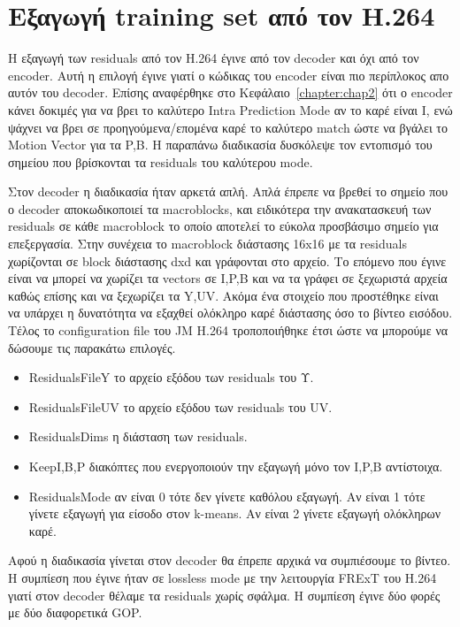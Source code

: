 \newpage

\section{Εξαγωγή training set από τον H.264}
\label{section:sect43}

\indent Η εξαγωγή των residuals από τον H.264 έγινε από τον decoder και όχι από τον encoder. Αυτή η επιλογή έγινε γιατί ο κώδικας του encoder είναι πιο περίπλοκος απο αυτόν του decoder. Επίσης αναφέρθηκε στο Κεφάλαιο~\ref{chapter:chap2} ότι ο encoder κάνει δοκιμές για να βρει το καλύτερο Intra Prediction Mode αν το καρέ είναι I, ενώ ψάχνει να βρει σε προηγούμενα/επομένα καρέ το καλύτερο match ώστε να βγάλει το Motion Vector για τα P,B. Η παραπάνω διαδικασία δυσκόλεψε τον εντοπισμό του σημείου που βρίσκονται τα residuals του καλύτερου mode.

\indent Στον decoder η διαδικασία ήταν αρκετά απλή. Απλά έπρεπε να βρεθεί το σημείο που ο decoder αποκωδικοποιεί τα macroblocks, και ειδικότερα την ανακατασκευή των residuals σε κάθε macroblock το οποίο αποτελεί το εύκολα προσβάσιμο σημείο για επεξεργασία. Στην συνέχεια το macroblock διάστασης 16x16 με τα residuals χωρίζονται σε block διάστασης dxd και γράφονται στο αρχείο. Το επόμενο που έγινε είναι να μπορεί να χωρίζει τα vectors σε I,P,B και να τα γράφει σε ξεχωριστά αρχεία καθώς επίσης και να ξεχωρίζει τα Y,UV. Ακόμα ένα στοιχείο που προστέθηκε είναι να υπάρχει η δυνατότητα να εξαχθεί ολόκληρο καρέ διάστασης όσο το βίντεο εισόδου. Τέλος το configuration file του JM H.264 \cite{misc:jm} τροποποιήθηκε έτσι ώστε να μπορούμε να δώσουμε τις παρακάτω επιλογές.

\begin{itemize}
    \item ResidualsFileY το αρχείο εξόδου των residuals του Υ.
    \item ResidualsFileUV το αρχείο εξόδου των residuals του UV.
    \item ResidualsDims η διάσταση των residuals.
    \item KeepI,B,P διακόπτες που ενεργοποιούν την εξαγωγή μόνο τον I,P,B αντίστοιχα.
    \item ResidualsMode αν είναι 0 τότε δεν γίνετε καθόλου εξαγωγή. Αν είναι 1 τότε γίνετε εξαγωγή για είσοδο στον k-means. Αν είναι 2 γίνετε εξαγωγή ολόκληρων καρέ.
\end{itemize}

\indent Αφού η διαδικασία γίνεται στον decoder θα έπρεπε αρχικά να συμπιέσουμε το βίντεο. Η συμπίεση που έγινε ήταν σε lossless mode με την λειτουργία FRExT του H.264 γιατί στον decoder θέλαμε τα residuals χωρίς σφάλμα. Η συμπίεση έγινε δύο φορές με δύο διαφορετικά GOP.

